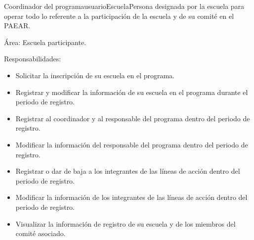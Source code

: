     \begin{actor}{Coordinador del programa}{usuarioEscuela}{Persona designada por la escuela para operar todo lo referente a la participación de la escuela y de su comité en el PAEAR.}

	\item[Área:] Escuela participante.

	\item[Responsabilidades:] \hspace{1pt}
	
		\begin{itemize}

		    \item Solicitar la inscripción de su escuela en el programa.
		    \item Registrar y modificar la información de su escuela en el programa durante el periodo de registro.
		    \item Registrar al coordinador y al responsable del programa dentro del periodo de registro.
		    \item Modificar la información del responsable del programa dentro del periodo de registro.	
		    \item Registrar o dar de baja a los integrantes de las líneas de acción dentro del periodo de registro.
		    \item Modificar la información de los integrantes de las líneas de acción dentro del periodo de registro.
		    \item Visualizar la información de registro de su escuela y de los miembros del comité asociado.



\end{itemize}
\end{actor}
